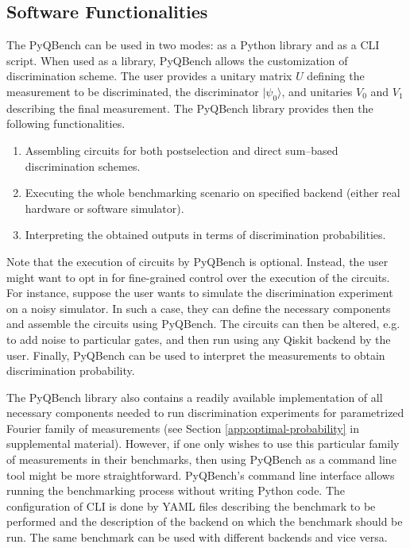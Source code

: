 \documentclass[preprint,12pt, a4paper, dvipsnames]{elsarticle}
\newcommand{\ket}[1]{\ensuremath{|#1\rangle}}
\newcommand{\1}{{\rm 1\hspace{-0.9mm}l}}
\theoremstyle{definition}
\begin{document}
\subsection{Software Functionalities}\label{sec:sortware-functionalities}

The PyQBench can be used in two modes: as a Python library and as a CLI script. When used as a
library, PyQBench allows the customization of discrimination scheme. The user provides
a unitary matrix $U$ defining the measurement to be discriminated, the discriminator $\ket{\psi_0}$,
and unitaries $V_0$ and $V_1$ describing the final measurement. The PyQBench library provides then
the following functionalities.

\begin{enumerate}
	\item Assembling circuits for both postselection and direct sum--based discrimination schemes.
	\item Executing the whole benchmarking scenario on specified backend (either real hardware or
	software simulator).
	\item Interpreting the obtained outputs in terms of discrimination probabilities.
\end{enumerate}
Note that the execution of circuits by PyQBench is optional. Instead, the user might want to opt in
for fine-grained control over the execution of the circuits. For instance, suppose the user wants to
simulate the discrimination experiment on a noisy simulator. In such a case, they can define the
necessary components and assemble the circuits using PyQBench. The circuits can then be altered,
e.g. to add noise to particular gates, and then run using any Qiskit backend by the user. Finally,
PyQBench can be used to interpret the measurements to obtain discrimination probability.

The PyQBench library also contains a readily available implementation of all necessary components
needed to run discrimination experiments for parametrized Fourier family of measurements (see
Section \ref{app:optimal-probability} in supplemental material). However, if one only wishes to use
this particular family of measurements in their benchmarks, then using PyQBench as a command line tool
might be more straightforward. PyQBench's command line interface allows running the benchmarking process
without writing Python code. The configuration of CLI is done by YAML \cite{yaml} files describing the
benchmark to be performed and the description of the backend on which the benchmark should be run.
The same benchmark can be used with different backends and vice versa.
\end{document}
